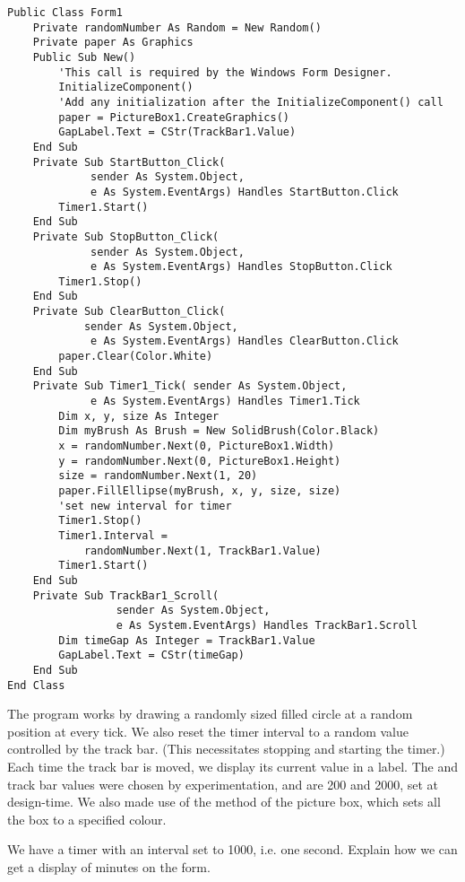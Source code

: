 		\begin{lstlisting}
Public Class Form1
	Private randomNumber As Random = New Random()
	Private paper As Graphics
	Public Sub New()
		'This call is required by the Windows Form Designer.
		InitializeComponent()
		'Add any initialization after the InitializeComponent() call
		paper = PictureBox1.CreateGraphics()
		GapLabel.Text = CStr(TrackBar1.Value)
	End Sub
	Private Sub StartButton_Click(
			 sender As System.Object,
			 e As System.EventArgs)	Handles StartButton.Click
		Timer1.Start()
	End Sub
	Private Sub StopButton_Click(
			 sender As System.Object,
			 e As System.EventArgs) Handles StopButton.Click
		Timer1.Stop()
	End Sub
	Private Sub ClearButton_Click(
			sender As System.Object,
			 e As System.EventArgs)	Handles ClearButton.Click
		paper.Clear(Color.White)
	End Sub
	Private Sub Timer1_Tick( sender As System.Object,
			 e As System.EventArgs)	Handles Timer1.Tick
		Dim x, y, size As Integer
		Dim myBrush As Brush = New SolidBrush(Color.Black)
		x = randomNumber.Next(0, PictureBox1.Width)
		y = randomNumber.Next(0, PictureBox1.Height)
		size = randomNumber.Next(1, 20)
		paper.FillEllipse(myBrush, x, y, size, size)
		'set new interval for timer
		Timer1.Stop()
		Timer1.Interval =
			randomNumber.Next(1, TrackBar1.Value)
		Timer1.Start()
	End Sub
	Private Sub TrackBar1_Scroll(
				 sender As System.Object,
				 e As System.EventArgs)	Handles TrackBar1.Scroll
		Dim timeGap As Integer = TrackBar1.Value
		GapLabel.Text = CStr(timeGap)
	End Sub
End Class
		\end{lstlisting}
		The program works by drawing a randomly sized filled circle at a random position at every tick. We also reset the timer interval to a random value controlled by the track bar. (This necessitates stopping and starting the timer.) Each time the track bar is moved, we display its current value in a label. The  and  track bar values were chosen by experimentation, and are 200 and 2000, set at design-time. We also made use of the  method of the picture box, which sets all the box to a specified colour.

		\begin{stqb}
			\begin{STQ}
				\item	We have a timer with an interval set to 1000, i.e. one second. Explain how we can get a display of minutes on the form.
			\end{STQ}
		\end{stqb}


